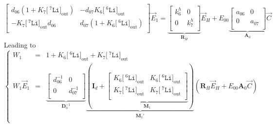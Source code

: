 \documentclass[aps,onecolumn,11pt]{revtex4}
\newcommand{\mychem}[1]{\mathtt{#1}}
\newcommand{\myconc}[1]{\big[#1\big]}
\newcommand{\spLi}[1]{{\!~^{#1}\mychem{Li}}}
\newcommand{\Li}[1]{\myconc{\spLi{#1}}}
\newcommand{\myout}[1]{{#1}_{\mathrm{out}}}
\newcommand{\LiOut}[1]{\myout{\Li{#1}}}
\newcommand{\mymat}[1]{{\bm{#1}}}
\begin{document}
\begin{equation}
\begin{bmatrix}
d_{06} \left(1+ K_7\LiOut{7}\right) & -d_{07}K_6\LiOut{6}\\
-K_7\LiOut{7}d_{06} & d_{07}\left(1 + K_6\LiOut{6}\right) \\
\end{bmatrix}
\vec{E}_1 = \underbrace{
\begin{bmatrix}
	k^h_6 & 0 \\
	0     & k^h_7\\
\end{bmatrix}
}_{\mymat{R}_H}
\vec{E}_H 
+ E_{00}
\underbrace{
\begin{bmatrix}
a_{06} & 0 \\
0 & a_{07} \\
\end{bmatrix}
}_{\mymat{A}_0}
\vec{C}
\end{equation}
Leading to
\begin{equation}
\left\lbrace
\begin{array}{rcl}
W_1 & = & 1 +    K_6\LiOut{6} +  K_7 \LiOut{7}  \\
W_1 \vec{E}_1 & = & \underbrace{
\begin{bmatrix}
d_{06}^{-1} & 0 \\
0 & d_{07}^{-1} \\
\end{bmatrix}
}_{\mymat{D}_0^{-1}}
\underbrace{
\left(
\mymat{I}_d+
\underbrace{
	\begin{bmatrix}
	K_6\LiOut{6} & K_6\LiOut{6}\\
	K_7\LiOut{7} & K_7 \LiOut{7}\\
	\end{bmatrix}
	}_{\mymat{M}_1}
		\right)}_{\mymat{M}_1'}
	\left( 
	\mymat{R}_H \vec{E}_H + E_{00} \mymat{A}_0 \vec{C}
	\right)
	\\
\end{array}
\right.
\end{equation}
\end{document}
